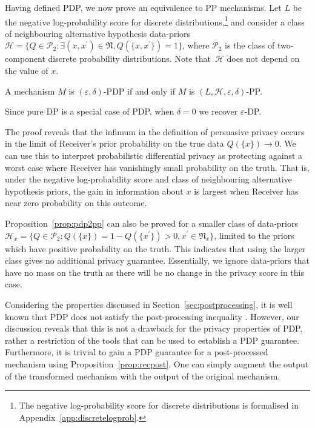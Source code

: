 \documentclass{article}
\theoremstyle{plain}
\theoremstyle{plain}
\theoremstyle{definition}
\theoremstyle{remark}
\theoremstyle{plain}
\renewcommand{\epsilon}{\varepsilon}
\begin{document}
Having defined PDP, we now prove an equivalence to PP mechanisms. Let $L$ be the negative log-probability score for discrete distributions,\footnote{The negative log-probability score for discrete distributions is formalised in Appendix~\ref{app:discretelogprob}.} and consider a class of neighbouring alternative hypothesis data-priors
$\mathcal{H}  = \{ Q \in \mathcal P_2: \exists (x,x^\prime)\in\mathfrak{N}, Q(\{ x , x^\prime \})= 1 \}$, where $\mathcal{P}_2$ is the class of two-component discrete probability distributions. Note that~$\mathcal{H}$ does not depend on the value of $x$.
\begin{proposition}\label{prop:pdp2pp}
    A mechanism $M$ is $(\epsilon,\delta)$-PDP if and only if $M$ is $(L,\mathcal{H},\epsilon,\delta)$-PP.
\end{proposition}
Since pure DP is a special case of PDP, when $\delta=0$ we recover $\epsilon$-DP.

The proof reveals that the infimum in the definition of persuasive privacy occurs in the limit of Receiver's prior probability on the true data $Q(\{x\}) \rightarrow 0$. We can use this to interpret probabilistic differential privacy as protecting against a worst case where Receiver has vanishingly small probability on the truth. That is, under the negative log-probability score and class of neighbouring alternative hypothesis priors, the gain in information about $x$ is largest when Receiver has near zero probability on this outcome.

Proposition~\ref{prop:pdp2pp} can also be proved for a smaller class of data-priors $\mathcal{H}_x = \{Q\in\mathcal{P}_2: Q(\{x\}) = 1 - Q(\{x^\prime\})> 0, x^\prime \in \mathfrak{N}_x\}$, limited to the priors which have positive probability on the truth. This indicates that using the larger class gives no additional privacy guarantee. Essentially, we ignore data-priors that have no mass on the truth as there will be no change in the privacy score in this case. 

Considering the properties discussed in Section~\ref{sec:postprocessing}, it is well known that PDP does not satisfy the post-processing inequality \citep{kifer2012axiomatic,meiser2018approximate}. However, our discussion reveals that this is not a drawback for the privacy properties of PDP, rather a restriction of the tools that can be used to establish a PDP guarantee. Furthermore, it is trivial to gain a PDP guarantee for a post-processed mechanism using Proposition~\ref{prop:recpost}. One can simply augment the output of the transformed mechanism with the output of the original mechanism. 
\end{document}
